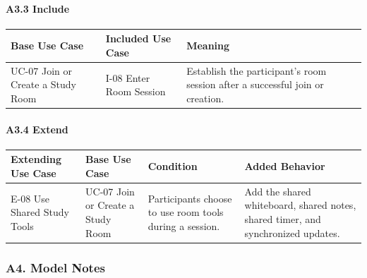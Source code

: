 \documentclass[12pt]{article}
\renewcommand{\baselinestretch}{1.5}
\begin{document}
\hypertarget{sec:a3-3-include}{}
\paragraph*{A3.3 Include}
\par\medskip

\begingroup
\small
\renewcommand{\baselinestretch}{1.0}\selectfont
\renewcommand{\arraystretch}{1.15}
\setlength{\tabcolsep}{6pt}
\begin{longtable}{|>{\raggedright\arraybackslash}p{}|>{\raggedright\arraybackslash}p{}|>{\raggedright\arraybackslash}p{}|}
\hline
\textbf{Base Use Case} & \textbf{Included Use Case} & \textbf{Meaning} \\ \hline
\endhead
UC-07 Join or Create a Study Room & I-08 Enter Room Session & Establish the participant's room session after a successful join or creation. \\ \hline
\end{longtable}
\endgroup
\par\medskip

\hypertarget{sec:a3-4-extend}{}
\paragraph*{A3.4 Extend}
\par\medskip

\begingroup
\small
\renewcommand{\baselinestretch}{1.0}\selectfont
\renewcommand{\arraystretch}{1.15}
\setlength{\tabcolsep}{6pt}
\begin{longtable}{|>{\raggedright\arraybackslash}p{}|>{\raggedright\arraybackslash}p{}|>{\raggedright\arraybackslash}p{}|>{\raggedright\arraybackslash}p{}|}
\hline
\textbf{Extending Use Case} & \textbf{Base Use Case} & \textbf{Condition} & \textbf{Added Behavior} \\ \hline
\endhead
E-08 Use Shared Study Tools & UC-07 Join or Create a Study Room & Participants choose to use room tools during a session. & Add the shared whiteboard, shared notes, shared timer, and synchronized updates. \\ \hline
\end{longtable}
\endgroup
\par\medskip

\hypertarget{sec:a4-model-notes}{}
\subsubsection*{A4. Model Notes}
\par\medskip
\end{document}
